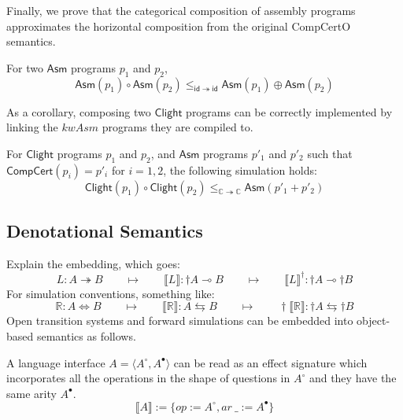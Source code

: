 \documentclass[sigplan,10pt,review,anonymous]{acmart}
\newcommand{\kw}[1]{\ensuremath{\mathsf{#1}}}
\begin{document}
Finally, we prove that the categorical composition of assembly programs
approximates the horizontal composition from the original CompCertO
semantics.
\begin{theorem}
  For two \kw{Asm} programs $p_1$ and $p_2$,
  \[
    \kw{Asm}(p_1) \circ \kw{Asm}(p_2) \le_{\kw{id} \twoheadrightarrow \kw{id}}
    \kw{Asm}(p_1) \oplus \kw{Asm}(p_2)
  \]
\end{theorem}
As a corollary, composing two $\kw{Clight}$ programs can be correctly
implemented by linking the $kw{Asm}$ programs they are compiled to.
\begin{corollary}
  For $\kw{Clight}$ programs $p_1$ and $p_2$, and $\kw{Asm}$ programs
  $p'_1$ and $p'_2$ such that $\kw{CompCert}(p_i) = p'_i$ for $i=1,2$,
  the following simulation holds:
  \[
    \kw{Clight}(p_1)\circ\kw{Clight}(p_2) \le_{\mathbb{C} \twoheadrightarrow \mathbb{C}}
    \kw{Asm}(p'_1 + p'_2)
  \]
\end{corollary}

\subsection{Denotational Semantics}

Explain the embedding, which goes:
\[
  L : A \twoheadrightarrow B
  \qquad \mapsto \qquad
  \llbracket L \rrbracket : {\dagger} A \multimap B
  \qquad \mapsto \qquad
  \llbracket L \rrbracket^\dagger : {\dagger} A \multimap {\dagger} B
\]
For simulation conventions, something like:
\[
  \mathbb{R} : A \Leftrightarrow B
  \qquad \mapsto \qquad
  \llbracket \mathbb{R} \rrbracket : A \leftrightarrows B
  \qquad \mapsto \qquad
  {\dagger}\llbracket \mathbb{R} \rrbracket :
    {\dagger}A \leftrightarrows {\dagger}B
\]
Open transition systems and forward simulations can be embedded into
object-based semantics as follows.

A language interface
$A = \langle A^\circ, A^\bullet \rangle$ can be read as an effect signature
which incorporates all the operations in the shape of questions in $A^\circ$ and
they have the same arity $A^\bullet$.
\[
  \llbracket A \rrbracket \mathrel{:=}
  \{ op \mathrel{:=} A^\circ, ar\ \_ \mathrel{:=} A^\bullet \}
\]
\end{document}
